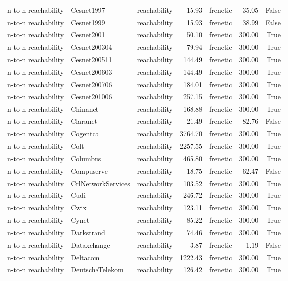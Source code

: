 \begin{tabular}{lllrlrr}
n-to-n reachability & Cesnet1997 & reachability & 15.93 & frenetic & 35.05 & False \\
n-to-n reachability & Cesnet1999 & reachability & 15.93 & frenetic & 38.99 & False \\
n-to-n reachability & Cesnet2001 & reachability & 50.10 & frenetic & 300.00 & True \\
n-to-n reachability & Cesnet200304 & reachability & 79.94 & frenetic & 300.00 & True \\
n-to-n reachability & Cesnet200511 & reachability & 144.49 & frenetic & 300.00 & True \\
n-to-n reachability & Cesnet200603 & reachability & 144.49 & frenetic & 300.00 & True \\
n-to-n reachability & Cesnet200706 & reachability & 184.01 & frenetic & 300.00 & True \\
n-to-n reachability & Cesnet201006 & reachability & 257.15 & frenetic & 300.00 & True \\
n-to-n reachability & Chinanet & reachability & 168.88 & frenetic & 300.00 & True \\
n-to-n reachability & Claranet & reachability & 21.49 & frenetic & 82.76 & False \\
n-to-n reachability & Cogentco & reachability & 3764.70 & frenetic & 300.00 & True \\
n-to-n reachability & Colt & reachability & 2257.55 & frenetic & 300.00 & True \\
n-to-n reachability & Columbus & reachability & 465.80 & frenetic & 300.00 & True \\
n-to-n reachability & Compuserve & reachability & 18.75 & frenetic & 62.47 & False \\
n-to-n reachability & CrlNetworkServices & reachability & 103.52 & frenetic & 300.00 & True \\
n-to-n reachability & Cudi & reachability & 246.72 & frenetic & 300.00 & True \\
n-to-n reachability & Cwix & reachability & 123.11 & frenetic & 300.00 & True \\
n-to-n reachability & Cynet & reachability & 85.22 & frenetic & 300.00 & True \\
n-to-n reachability & Darkstrand & reachability & 74.46 & frenetic & 300.00 & True \\
n-to-n reachability & Dataxchange & reachability & 3.87 & frenetic & 1.19 & False \\
n-to-n reachability & Deltacom & reachability & 1222.43 & frenetic & 300.00 & True \\
n-to-n reachability & DeutscheTelekom & reachability & 126.42 & frenetic & 300.00 & True \\
\bottomrule
\end{tabular}
